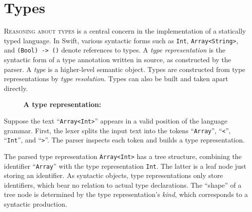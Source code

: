 \documentclass[../generics]{subfiles}
\begin{document}
\chapter{Types}\label{chap:types}

\lettrine{R}{easoning about types} is a central concern in the implementation of a statically typed language. In Swift, various syntactic forms such as \texttt{Int}, \texttt{Array<String>}, and \texttt{(Bool) -> ()} denote references to types. A \emph{type representation} is the syntactic form of a type annotation written in source, as constructed by the parser. A \emph{type} is a higher-level semantic object. Types are constructed from type representations by \emph{type resolution}. Types can also be built and taken apart directly.

\medskip

\begin{figure}
\begin{center}
\textbf{A type representation:}
\end{center}
\end{figure}

Suppose the text ``\texttt{Array<Int>}'' appears in a valid position of the language grammar. First, the lexer splits the input text into the tokens ``\texttt{Array}'', ``\texttt{<}'', ``\texttt{Int}'', and ``\texttt{>}''. The parser inspects each token and builds a type representation.

The parsed type representation \texttt{Array<Int>} has a tree structure, combining the identifier ``\texttt{Array}'' with the type representation \texttt{Int}. The latter is a leaf node just storing an identifier. As syntactic objects, type representations only store identifiers, which bear no relation to actual type declarations. The ``shape'' of a tree node is determined by the type representation's \emph{kind}, which corresponds to a syntactic production.
\end{document}
